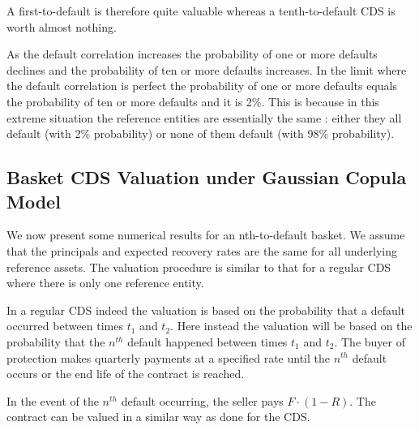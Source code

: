 A first-to-default is therefore quite valuable whereas a tenth-to-default CDS is worth almost nothing.

As the default correlation increases the probability of one or more defaults declines and the probability of ten or more defaults increases. In the limit where the default correlation is perfect the probability of one or more defaults equals the probability of ten or more defaults and it is 2\%. This is because in this extreme situation the reference entities are essentially the same : either they all default (with 2\% probability) or none of them default (with 98\% probability).

\subsection{Basket CDS Valuation under Gaussian Copula Model}\label{basket-cds-valuation-under-market-standard-model}
We now present some numerical results for an nth-to-default basket.
We assume that the principals and expected recovery rates are the same
for all underlying reference assets. The valuation procedure is similar
to that for a regular CDS where there is only one reference entity.

In a regular CDS indeed the valuation is based on the probability that a
default occurred between times \(t_1\) and \(t_2\). Here instead the
valuation will be based on the probability that the $n^{th}$ default happened
between times \(t_1\) and \(t_2\).
The buyer of protection makes quarterly payments at a
specified rate until the $n^{th}$ default occurs or the end life
of the contract is reached.

In the event of the $n^{th}$ default occurring, the seller pays
\(F\cdot(1-R)\). The contract can be valued in a similar way as done for the CDS.

